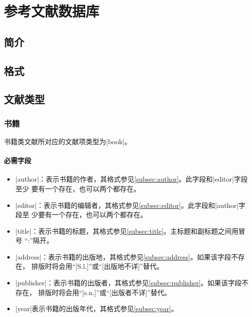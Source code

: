\chapter{参考文献数据库}\label{chap:bib}

\section{简介}\label{sec:bib-intro}


\section{格式}\label{sec:bib-format}

\section{文献类型}\label{sec:bib-type}

\subsection{书籍}

书籍类文献所对应的{\BibTeX}文献项类型为|book|。

\subsubsection{必需字段}

\begin{itemize}
\item |author|：表示书籍的作者，其格式参见\ref{subsec:author}。此字段和|editor|字段至少
要有一个存在，也可以两个都存在。
\item |editor|：表示书籍的编辑者，其格式参见\ref{subsec:editor}。此字段和|author|字段至
少要有一个存在，也可以两个都存在。
\item |title|：表示书籍的标题，其格式参见\ref{subsec:title}。主标题和副标题之间用冒号
``:''隔开。
\item |address|：表示书籍的出版地，其格式参见\ref{subsec:address}。如果该字段不存在，
{\BibTeX}排版时将会用``[S.l.]''或``[出版地不详]''替代。
\item |publisher|：表示书籍的出版者，其格式参见\ref{subsec:publisher}。如果该字段不存在，
{\BibTeX}排版时将会用``[s.n.]''或``[出版者不详]''替代。
\item |year|表示书籍的出版年代，其格式参见\ref{subsec:year}。
\end{itemize}

